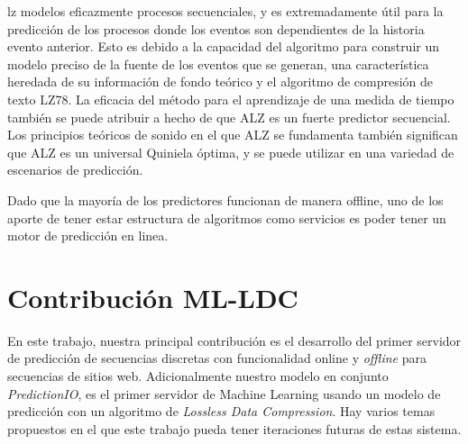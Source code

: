%

lz modelos eficazmente procesos secuenciales, y es extremadamente útil para la predicción de los procesos donde los eventos son dependientes de la historia evento anterior. Esto es debido a la capacidad del algoritmo para construir un modelo preciso de la fuente de los eventos que se generan, una característica heredada de su información de fondo teórico y el algoritmo de compresión de texto LZ78.
%
La eficacia del método para el aprendizaje de una medida de tiempo también se puede atribuir a hecho de que ALZ es un fuerte predictor secuencial. Los principios teóricos de sonido en el que ALZ se fundamenta también significan que ALZ es un universal Quiniela óptima, y se puede utilizar en una variedad de escenarios de predicción.
%

Dado que la mayoría de los predictores funcionan de 
manera offline, uno de los aporte de tener estar estructura de algoritmos como servicios es poder tener un motor de predicción en linea.

\section{Contribución ML-LDC}


En este trabajo,  nuestra principal contribución es el desarrollo del primer servidor de predicción de secuencias discretas con funcionalidad online y \emph{offline} para secuencias de  sitios web. Adicionalmente nuestro modelo en conjunto \emph{PredictionIO}, es el primer servidor de Machine Learning usando un modelo de predicción con un algoritmo de \emph{Lossless Data Compression}. Hay varios temas propuestos en el que este trabajo pueda tener iteraciones  futuras de estas sistema. 